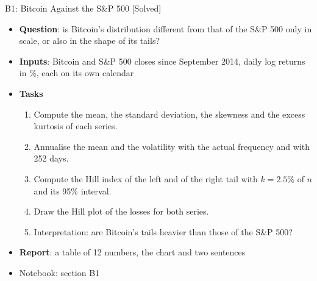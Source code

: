 \begin{frame}{B1: Bitcoin Against the S\&P 500 [Solved]}
\itemsize{\footnotesize}
\begin{itemize}
\item \textbf{Question}: is Bitcoin's distribution different from that of the S\&P 500 only in scale, or also in the shape of its tails?
\item \textbf{Inputs}: Bitcoin and S\&P 500 closes since September 2014, daily log returns in \%, each on its own calendar
\item \textbf{Tasks}
\begin{enumerate}
    \item Compute the mean, the standard deviation, the skewness and the excess kurtosis of each series.
    \item Annualise the mean and the volatility with the actual frequency and with 252 days.
    \item Compute the Hill index of the left and of the right tail with $k = 2.5\%$ of $n$ and its 95\% interval.
    \item Draw the Hill plot of the losses for both series.
    \item Interpretation: are Bitcoin's tails heavier than those of the S\&P 500?
\end{enumerate}
\item \textbf{Report}: a table of 12 numbers, the chart and two sentences
\item Notebook: section B1
\end{itemize}
\end{frame}

